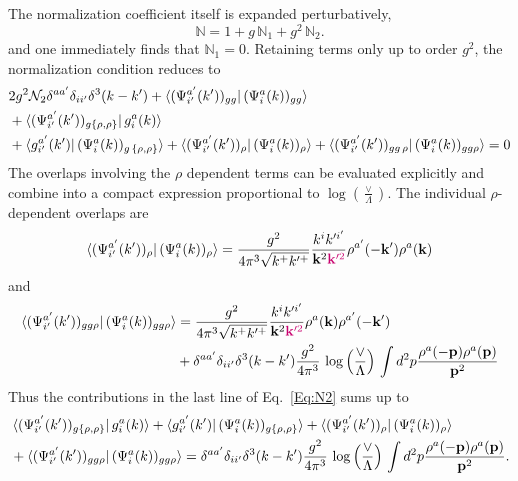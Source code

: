\documentclass[a4paper,11pt]{article}
\def\v#1{\mathbf{#1}}
\def\mf#1{\mathbb{#1}}
\begin{document}
The normalization coefficient itself is expanded perturbatively, 
$$\mf{N} = 1 + g\, \mf{N}_{1} +  g^{2}\, \mf{N}_{2}.$$
and one immediately finds that $\mf{N}_{1} = 0$. Retaining terms only up to order $g^{2}$, the normalization condition reduces to
\begin{align}
\label{Eq:N2}
 & 2 g^2 {\cal N}_2  \delta^{a a'} \delta_{i i'} \delta^{3}(k-k') 
 +  \bra{ (\Psi^{a'}_{i'}(k') )_{gg} } (\Psi^{a}_{i}(k) )_{gg}\rangle     
  \\ \notag    & 
  + \bra{ (\Psi^{a'}_{i'}(k'))_{g \{\rho,\rho\} } }  
  g^{a}_{i}(k) \rangle \notag \\ & + 
  \bra{ g^{a'}_{i'}(k') }  
  (\Psi^{a}_{i}(k))_{g\, \{\rho,\rho\}}  \rangle 
  +  \bra{ (\Psi^{a'}_{i'}(k') )_{\rho} } (\Psi^{a}_{i}(k) )_{\rho}\rangle  
  +  \bra{ (\Psi^{a'}_{i'}(k') )_{gg\,\rho} } (\Psi^{a}_{i}(k) )_{gg\rho}\rangle 
  = 0
\end{align}
The overlaps involving the $\rho$ dependent terms can be evaluated explicitly and combine into a compact expression proportional to $\log{\left(\frac{\vee}{\Lambda}\right)}$. {\color{chg}The individual $\rho$-dependent overlaps are}
\begin{align}
  \bra{ (\Psi^{a^{\prime}}_{i^{\prime}}(k^{\prime}) )_{\rho} } (\Psi^{a}_{i}(k) )_{\rho}\rangle   = 
  \frac{g^2}{4 \pi^3 \sqrt{k^+ k^{\prime +}}} \frac{k^{i} k^{\prime i^{\prime}}}{\v{k}^2{\color{chg}\v{k}^{\prime 2}}} \rho^{a^{\prime}} (-\v{k}^\prime) \rho^a (\v{k})
\end{align}
and 
\begin{align}
  \bra{ (\Psi^{a^{\prime}}_{i^{\prime}}(k^{\prime}) )_{gg\rho} } (\Psi^{a}_{i}(k) )_{gg\rho}\rangle   &  = 
  \frac{g^2}{4 \pi^3 \sqrt{k^+ k^{\prime +}}} \frac{k^{i} k^{\prime i^{\prime}}}{\v{k}^2{\color{chg}\v{k}^{\prime 2}}}\rho^a (\v{k}) \rho^{a^{\prime}} (-\v{k}^{\prime})
 \notag \\ &  + 
 \delta^{a a^{\prime}} \delta_{i i^{\prime}}  \delta^3(k-k^{\prime})  
  \frac{g^2}{4 \pi^3 }\,\log{\left(\frac{\vee}{\Lambda}\right)}\,
  \int d^2p \frac{\rho^a(-\v{p}) \rho^a(\v{p})}{\v{p}^2}
  \end{align} 
Thus the contributions in the last line  of Eq.~\eqref{Eq:N2} sums up to 
\begin{align}
  &\bra{ (\Psi^{a^{\prime}}_{i^{\prime}}(k^{\prime}))_{g \{\rho,\rho\} } }  
  g^{a}_{i}(k) \rangle + 
  \bra{ g^{a^{\prime}}_{i^{\prime}}(k^{\prime}) }  
  (\Psi^{a}_{i}(k))_{g \{\rho,\rho\}}  \rangle 
  +  \bra{ (\Psi^{a^{\prime}}_{i^{\prime}}(k^{\prime}) )_{\rho} } (\Psi^{a}_{i}(k) )_{\rho}\rangle    
   \notag \\
  & +  \bra{ (\Psi^{a^{\prime}}_{i^{\prime}}(k^{\prime}) )_{gg\rho} } (\Psi^{a}_{i}(k) )_{gg\rho}\rangle   
 = 
 \delta^{a a^{\prime}} \delta_{i i^{\prime}}  \delta^3(k-k^{\prime})  
  \frac{g^2}{4 \pi^3 } \,\log{\left(\frac{\vee}{\Lambda}\right)}\,
  \int d^2p \frac{\rho^a(-\v{p}) \rho^a(\v{p})}{\v{p}^2} .
\end{align}
\end{document}
